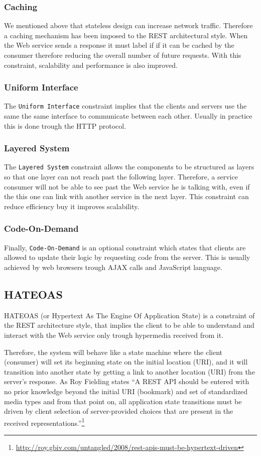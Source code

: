 \subsubsection{Caching}
We mentioned above that stateless design can increase network traffic. Therefore a caching mechanism has been imposed to the REST architectural style. When the Web service sends a response it must label if if it can be cached by the consumer therefore reducing the overall number of future requests. With this constraint, scalability and performance is also improved.
\subsubsection{Uniform Interface}
The \texttt{Uniform Interface} constraint implies that the clients and servers use the same the same interface to communicate between each other. Usually in practice this is done trough the HTTP protocol.
\subsubsection{Layered System}
The \texttt{Layered System} constraint allows the components to be structured as layers so that one layer can not reach past the following layer. Therefore, a service consumer will not be able to see past the Web service he is talking with, even if the this one can link with another service in the next layer. This constraint can reduce efficiency buy it improves scalability.
\subsubsection{Code-On-Demand}
Finally, \texttt{Code-On-Demand} is an optional constraint which states that clients are allowed to update their logic by requesting code from the server. This is usually achieved by web browsers trough AJAX calls and JavaScript language.

\subsection{HATEOAS}
\label{sub-sec:hateoas}

HATEOAS (or Hypertext As The Engine Of Application State) is a constraint of the REST architecture style, that implies the client to be able to understand and interact with the Web service only trough hypermedia received from it.

Therefore, the system will behave like a state machine where the client (consumer) will set its beginning state on the initial location (URI), and it will transition into another state by getting a link to another location (URI) from the server's response. As Roy Fielding states ``A REST API should be entered with no prior knowledge beyond the initial URI (bookmark) and set of standardized media types and from that point on, all application state transitions must be driven by client selection of server-provided choices that are present in the received representations.''\footnote{\url{http://roy.gbiv.com/untangled/2008/rest-apis-must-be-hypertext-driven}}

